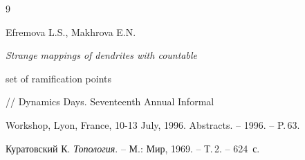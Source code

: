 \begin{thebibliography}{9}







Efremova L.S., Makhrova E.N. {\em Strange mappings of dendrites with countable


set of ramification points} // Dynamics Days. Seventeenth Annual Informal


Workshop, Lyon, France, 10-13 July, 1996. Abstracts. -- 1996. -- P.\,63.







Куратовский К. {\em Топология}. -- М.: Мир, 1969. -- Т.\,2. -- 624~с.





\end{thebibliography}





\vskip 2cm















